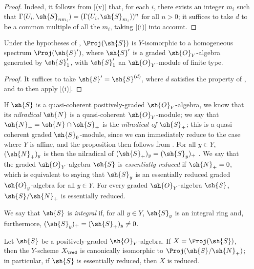\begin{proof}
Indeed, it follows from [(v)] that, for each $i$, there exists an integer $m_i$ such that $\Gamma(U_i,\sh{S}_{nm_i})=(\Gamma(U_i,\sh{S}_{m_i}))^n$ for all $n>0$;
it suffices to take $d$ to be a common multiple of all the $m_i$, taking [(i)] into account.
\end{proof}

\begin{corollary}[3.1.11]
\label{II.3.1.11}
Under the hypotheses of , $\Proj(\sh{S})$ is $Y$-isomorphic to a homogeneous spectrum $\Proj(\sh{S}')$, where $\sh{S}'$ is a graded $\sh{O}_Y$-algebra generated by $\sh{S}'_1$, with $\sh{S}'_1$ an $\sh{O}_Y$-module of finite type.
\end{corollary}

\begin{proof}
It suffices to take $\sh{S}'=\sh{S}^{(d)}$, where $d$ satisfies the property of , and to then apply [(i)].
\end{proof}

\begin{env}[3.1.12]
\label{II.3.1.12}
If $\sh{S}$ is a quasi-coherent positively-graded $\sh{O}_Y$-algebra, we know  that its \emph{nilradical} $\sh{N}$ is a quasi-coherent $\sh{O}_Y$-module;
we say that $\sh{N}_+=\sh{N}\cap\sh{S}_+$ is the \emph{nilradical of $\sh{S}_+$};
this is a quasi-coherent graded $\sh{S}_0$-module, since we can immediately reduce to the case where $Y$ is affine, and the proposition then follows from .
For all $y\in Y$, $(\sh{N}_+)_y$ is then the nilradical of $(\sh{S}_+)_y=(\sh{S}_y)_+$ .
We say that the graded $\sh{O}_Y$-algebra $\sh{S}$ is \emph{essentially reduced} if $\sh{N}_+=0$, which is equivalent
to saying that $\sh{S}_y$ is an essentially reduced graded $\sh{O}_y$-algebra for all $y\in Y$.
For every graded $\sh{O}_Y$-algebra $\sh{S}$, $\sh{S}/\sh{N}_+$ is essentially reduced.

We say that $\sh{S}$ is \emph{integral} if, for all $y\in Y$, $\sh{S}_y$ is an integral ring and, furthermore, $(\sh{S}_y)_+=(\sh{S}_+)_y\neq0$.
\end{env}

\begin{proposition}[3.1.13]
\label{II.3.1.13}
Let $\sh{S}$ be a positively-graded $\sh{O}_Y$-algebra.
If $X=\Proj(\sh{S})$, then the $Y$-scheme $X_\red$ is canonically isomorphic to $\Proj(\sh{S}/\sh{N}_+)$;
in particular, if $\sh{S}$ is essentially reduced, then $X$ is reduced.
\end{proposition}

